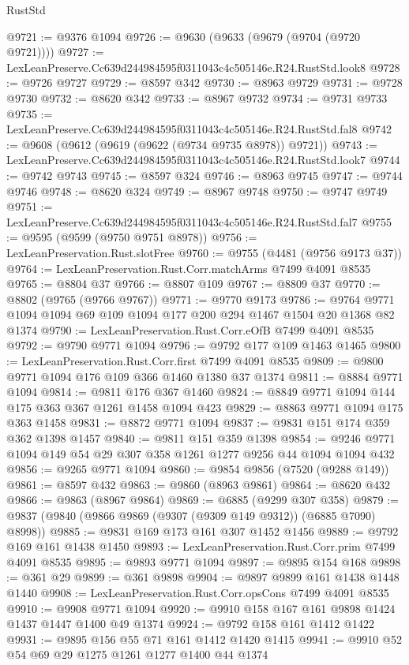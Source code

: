 \begin{lexlean}{RustStd}
\begin{coremodule}
@9721 := @9376 @1094
@9726 := @9630 (@9633 (@9679 (@9704 (@9720 @9721))))
@9727 := LexLeanPreserve.Cc639d244984595f0311043c4c505146e.R24.RustStd.look8
@9728 := @9726 @9727
@9729 := @8597 @342
@9730 := @8963 @9729
@9731 := @9728 @9730
@9732 := @8620 @342
@9733 := @8967 @9732
@9734 := @9731 @9733
@9735 := LexLeanPreserve.Cc639d244984595f0311043c4c505146e.R24.RustStd.fal8
@9742 := @9608 (@9612 (@9619 (@9622 (@9734 @9735 @8978)) @9721))
@9743 := LexLeanPreserve.Cc639d244984595f0311043c4c505146e.R24.RustStd.look7
@9744 := @9742 @9743
@9745 := @8597 @324
@9746 := @8963 @9745
@9747 := @9744 @9746
@9748 := @8620 @324
@9749 := @8967 @9748
@9750 := @9747 @9749
@9751 := LexLeanPreserve.Cc639d244984595f0311043c4c505146e.R24.RustStd.fal7
@9755 := @9595 (@9599 (@9750 @9751 @8978))
@9756 := LexLeanPreservation.Rust.slotFree
@9760 := @9755 (@4481 (@9756 @9173 @37))
@9764 := LexLeanPreservation.Rust.Corr.matchArms @7499 @4091 @8535
@9765 := @8804 @37
@9766 := @8807 @109
@9767 := @8809 @37
@9770 := @8802 (@9765 (@9766 @9767))
@9771 := @9770 @9173
@9786 := @9764 @9771 @1094 @1094 @69 @109 @1094 @177 @200 @294 @1467 @1504 @20 @1368 @82 @1374
@9790 := LexLeanPreservation.Rust.Corr.eOfB @7499 @4091 @8535
@9792 := @9790 @9771 @1094
@9796 := @9792 @177 @109 @1463 @1465
@9800 := LexLeanPreservation.Rust.Corr.first @7499 @4091 @8535
@9809 := @9800 @9771 @1094 @176 @109 @366 @1460 @1380 @37 @1374
@9811 := @8884 @9771 @1094
@9814 := @9811 @176 @367 @1460
@9824 := @8849 @9771 @1094 @144 @175 @363 @367 @1261 @1458 @1094 @423
@9829 := @8863 @9771 @1094 @175 @363 @1458
@9831 := @8872 @9771 @1094
@9837 := @9831 @151 @174 @359 @362 @1398 @1457
@9840 := @9811 @151 @359 @1398
@9854 := @9246 @9771 @1094 @149 @54 @29 @307 @358 @1261 @1277 @9256 @44 @1094 @1094 @432
@9856 := @9265 @9771 @1094
@9860 := @9854 @9856 (@7520 (@9288 @149))
@9861 := @8597 @432
@9863 := @9860 (@8963 @9861)
@9864 := @8620 @432
@9866 := @9863 (@8967 @9864)
@9869 := @6885 (@9299 @307 @358)
@9879 := @9837 (@9840 (@9866 @9869 (@9307 (@9309 @149 @9312)) (@6885 @7090) @8998))
@9885 := @9831 @169 @173 @161 @307 @1452 @1456
@9889 := @9792 @169 @161 @1438 @1450
@9893 := LexLeanPreservation.Rust.Corr.prim @7499 @4091 @8535
@9895 := @9893 @9771 @1094
@9897 := @9895 @154 @168
@9898 := @361 @29
@9899 := @361 @9898
@9904 := @9897 @9899 @161 @1438 @1448 @1440
@9908 := LexLeanPreservation.Rust.Corr.opsCons @7499 @4091 @8535
@9910 := @9908 @9771 @1094
@9920 := @9910 @158 @167 @161 @9898 @1424 @1437 @1447 @1400 @49 @1374
@9924 := @9792 @158 @161 @1412 @1422
@9931 := @9895 @156 @55 @71 @161 @1412 @1420 @1415
@9941 := @9910 @52 @54 @69 @29 @1275 @1261 @1277 @1400 @44 @1374

\end{coremodule}
\end{lexlean}
